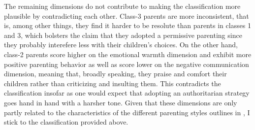 The remaining dimensions do not contribute to making the classification more plausible by contradicting each other. Class-3 parents are more inconsistent, that is, among other things, they find it harder to be resolute than parents in classes 1 and 3, which bolsters the claim that they adopted a permissive parenting since they probably interefere less with their children's choices. On the other hand, class-2 parents score higher on the emotional warmth dimension and exhibit more positive parenting behavior as well as score lower on the negative communication dimension, meaning that, broadly speaking, they praise and comfort their children rather than criticizing and insulting them. This contradicts the classification insofar as one would expect that adopting an authoritarian strategy goes hand in hand with a harsher tone. Given that these dimensions are only partly related to the characteristics of the different parenting styles outlines in \textcite{doepkeEconomicsParenting2019}, I stick to the classification provided above.